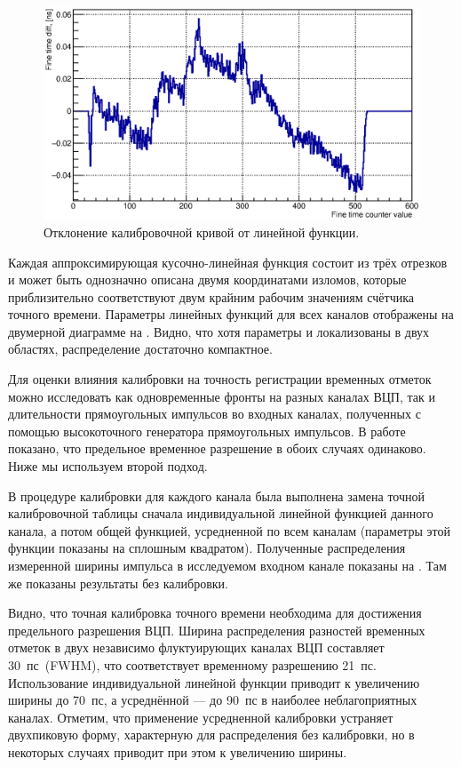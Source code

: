 \begin{figure}
\includegraphics[width=1.0\textwidth]{pictures/18_CalTableMinusFit_0010_01.eps}
\caption{Отклонение калибровочной кривой от линейной функции.}
\label{fig:CalibTableMinusFit}
\end{figure}

Каждая аппроксимирующая кусочно-линейная функция состоит из трёх отрезков и может быть однозначно описана двумя координатами изломов, которые приблизительно соответствуют двум крайним рабочим значениям счётчика точного времени. Параметры линейных функций для всех каналов отображены на двумерной диаграмме на . Видно, что хотя параметры и локализованы в двух областях, распределение достаточно компактное.

Для оценки влияния калибровки на точность регистрации временных отметок можно исследовать как одновременные фронты на разных каналах ВЦП, так и длительности прямоугольных импульсов во входных каналах, полученных с помощью высокоточного генератора прямоугольных импульсов. В работе~\cite{PEPAN} показано, что предельное временное разрешение в обоих случаях одинаково. Ниже мы используем второй подход.

В процедуре калибровки для каждого канала была выполнена замена точной калибровочной таблицы сначала индивидуальной линейной функцией данного канала, а потом общей функцией, усредненной по всем каналам (параметры этой функции показаны на  сплошным квадратом). Полученные распределения измеренной ширины импульса в исследуемом входном канале показаны на . Там же показаны результаты без калибровки.

Видно, что точная калибровка точного времени необходима для достижения предельного разрешения ВЦП. Ширина распределения разностей временных отметок в двух независимо флуктуирующих каналах ВЦП составляет 30~пс~(FWHM), что соответствует временному разрешению 21~пс. Использование индивидуальной линейной функции приводит к увеличению ширины до 70~пс, а усреднённой --- до 90~пс в наиболее неблагоприятных каналах. Отметим, что применение усредненной калибровки устраняет двухпиковую форму, характерную для распределения без калибровки, но в некоторых случаях приводит при этом к увеличению ширины.

